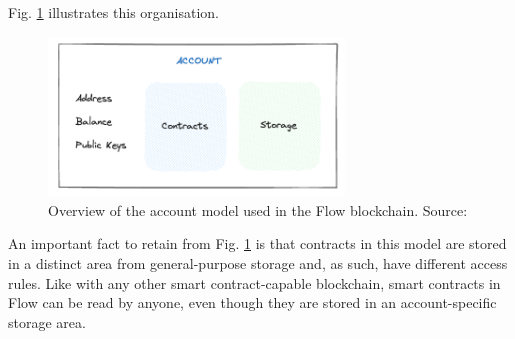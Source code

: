 Fig. \ref{fig:flow_account_model} illustrates this organisation.

\begin{figure}[htp]
    \centering
    \includegraphics[width=0.7\textwidth]{../Images/Flow_account_model.png}
    \caption{Overview of the account model used in the Flow blockchain. Source: \cite{flow2024}}
    \label{fig:flow_account_model}
\end{figure}

An important fact to retain from Fig. \ref{fig:flow_account_model} is that contracts in this model are stored in a distinct area from general-purpose storage and, as such, have different access rules. Like with any other smart contract-capable blockchain, smart contracts in Flow can be read by anyone, even though they are stored in an account-specific storage area.

